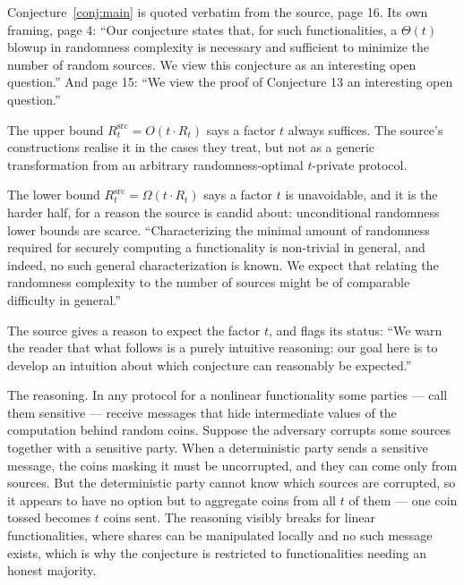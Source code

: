 \documentclass{aicr-conjecture}
\newcommand{\Rt}{R_{t}}
\newcommand{\Rts}{R^{\mathrm{src}}_{t}}
\begin{document}
\begin{remark}\label{rem:framing}
Conjecture~\ref{conj:main} is quoted verbatim from the source, page 16.
Its own framing, page 4: ``Our conjecture states that, for such
functionalities, a $\Theta(t)$ blowup in randomness complexity is
necessary and sufficient to minimize the number of random sources. We
view this conjecture as an interesting open question.'' And page 15:
``We view the proof of Conjecture 13 an interesting open question.''
\end{remark}

\begin{remark}\label{rem:halves}
The upper bound $\Rts = O(t \cdot \Rt)$ says a factor $t$ always
suffices. The source's constructions realise it in the cases they treat,
but not as a generic transformation from an arbitrary randomness-optimal
$t$-private protocol.

The lower bound $\Rts = \Omega(t \cdot \Rt)$ says a factor $t$ is
unavoidable, and it is the harder half, for a reason the source is candid
about: unconditional randomness lower bounds are scarce. ``Characterizing
the minimal amount of randomness required for securely computing a
functionality is non-trivial in general, and indeed, no such general
characterization is known. We expect that relating the randomness
complexity to the number of sources might be of comparable difficulty in
general.''
\end{remark}

\begin{remark}\label{rem:intuition}
The source gives a reason to expect the factor $t$, and flags its
status: ``We warn the reader that what follows is a purely intuitive
reasoning: our goal here is to develop an intuition about which
conjecture can reasonably be expected.''

The reasoning. In any protocol for a nonlinear functionality some parties
--- call them sensitive --- receive messages that hide intermediate values
of the computation behind random coins. Suppose the adversary corrupts
some sources together with a sensitive party. When a deterministic party
sends a sensitive message, the coins masking it must be uncorrupted, and
they can come only from sources. But the deterministic party cannot know
which sources are corrupted, so it appears to have no option but to
aggregate coins from all $t$ of them --- one coin tossed becomes $t$ coins
sent. The reasoning visibly breaks for linear functionalities, where
shares can be manipulated locally and no such message exists, which is why
the conjecture is restricted to functionalities needing an honest
majority.
\end{remark}
\end{document}
